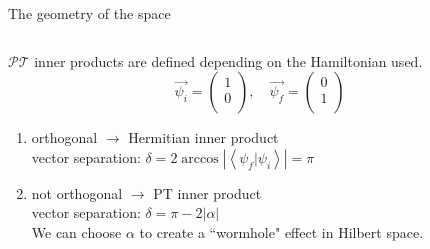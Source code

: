 \documentclass[10pt]{beamer}
\begin{document}
\begin{frame}{The geometry of the space}
\begin{columns}
    \hspace{1.5em}
    \begin{column}{\textwidth}
    $\mathcal{PT}$ inner products are defined depending on the Hamiltonian used.\\
    \pause
    \vspace{0.5cm}
    \begin{equation*}
        \vec{\psi_i} = \begin{pmatrix}
                1 \\
                0 \\                
        \end{pmatrix}, \quad
        \vec{\psi_f} = \begin{pmatrix}
                0 \\
                1 \\                
        \end{pmatrix}
        \end{equation*}
    \begin{enumerate}
        \item orthogonal $\to$ \textcolor{myNewColorA}{Hermitian} inner product\\
        \pause
        \pause
        vector separation: $\delta = 2 \arccos{|\left< \psi_{f}| \psi_{i}\right>|} = \pi$\\
        \pause 
        \item not orthogonal $\to$ \textcolor{myNewColorC}{PT}  inner  product\\
        \pause
        vector separation: $\delta = \pi - 2|\alpha|$\\
        \pause 
        \vspace{0.5cm}
        We can choose $\alpha$ to create a ``wormhole" effect in Hilbert space.
        \end{enumerate}
    \end{column}
\end{columns}
\end{frame}

\end{document}
